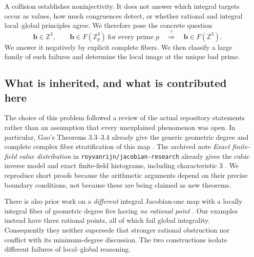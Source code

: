 \documentclass[11pt]{article}
\numberwithin{equation}{section}
\theoremstyle{plain}
\theoremstyle{plain}
\theoremstyle{plain}
\theoremstyle{definition}
\theoremstyle{definition}
\theoremstyle{definition}
\theoremstyle{remark}
\newcommand{\Z}{\mathbb Z}\newcommand{\Q}{\mathbb Q}
\newcommand{\target}{\boldsymbol b}
\begin{document}
A collision establishes noninjectivity. It does not answer which integral
targets occur as values, how much congruences detect, or whether rational
and integral local--global principles agree. We therefore pose the concrete
question
\begin{equation}\label{alg:eq:localglobal-question}
\target\in\Z^3,\qquad
\target\in F(\Z_p^3)\ \text{for every prime }p
\quad\stackrel{?}{\Longrightarrow}\quad
\target\in F(\Z^3).
\end{equation}
We answer it negatively by explicit complete fibers. We then classify a
large family of such failures and determine the local image at the unique
bad prime.

\subsection{What is inherited, and what is contributed here}
The choice of this problem followed a review of the actual repository
statements rather than an assumption that every unexplained phenomenon
was open. In particular, Gao's Theorems 3.3--3.4 already give the generic
geometric degree and complete complex fiber stratification of this map
\cite{gao}. The archived note \emph{Exact finite-field value distribution}
in \texttt{royvanrijn/jacobian-research} already gives the cubic inverse
model and exact finite-field histograms, including characteristic $3$
\cite{finitefield}. We reproduce short proofs because the arithmetic
arguments depend on their precise boundary conditions, not because these
are being claimed as new theorems.

There is also prior work on a \emph{different} integral Jacobian-one map
with a locally integral fiber of geometric degree five having \emph{no
rational point} \cite{degreefive}. Our examples instead have three rational
points, all of which fail global integrality. Consequently they neither
supersede that stronger rational obstruction nor conflict with its
minimum-degree discussion. The two constructions isolate different
failures of local--global reasoning.
\end{document}

